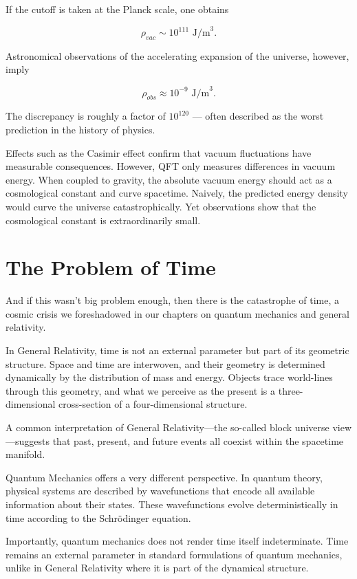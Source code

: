 If the cutoff is taken at the Planck scale, one obtains

\[
\rho_{vac} \sim 10^{111} \text{ J/m}^3.
\]

Astronomical observations of the accelerating expansion of the universe, however, imply

\[
\rho_{obs} \approx 10^{-9} \text{ J/m}^3.
\]

The discrepancy is roughly a factor of $10^{120}$ --- often described as the worst prediction in the history of physics.

Effects such as the Casimir effect confirm that vacuum fluctuations have measurable consequences. However, QFT only measures differences in vacuum energy. When coupled to gravity, the absolute vacuum energy should act as a cosmological constant and curve spacetime. Naively, the predicted energy density would curve the universe catastrophically. Yet observations show that the cosmological constant is extraordinarily small.


\section{The Problem of Time}

And if this wasn't big problem enough, then there is the catastrophe of time, a cosmic crisis we foreshadowed in our chapters on quantum mechanics and general relativity.

In General Relativity, time is not an external parameter but part of its geometric structure. Space and time are interwoven, and their geometry is determined
dynamically by the distribution of mass and energy. Objects trace world-lines through this geometry, and what we perceive as the present is a three-dimensional cross-section of a four-dimensional structure.

A common interpretation of General Relativity—the so-called block universe view—suggests that past, present, and future events all coexist within the spacetime manifold.

Quantum Mechanics offers a very different perspective. In quantum theory, physical systems are described by wavefunctions that encode all available information about their states.
These wavefunctions evolve deterministically in time according to the Schrödinger equation.

Importantly, quantum mechanics does not render time itself indeterminate. Time remains an external parameter in standard formulations of quantum mechanics,
unlike in General Relativity where it is part of the dynamical structure.

